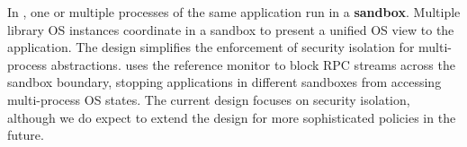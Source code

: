 In \graphene{},
one or multiple processes of the same application run in a {\bf sandbox}.
Multiple library OS instances coordinate
in a sandbox
to present a unified OS view
to the application.
The design simplifies the enforcement of security isolation for multi-process abstractions.
\graphene{}
uses the reference monitor to block RPC streams across the sandbox boundary,
stopping applications in different sandboxes from accessing multi-process OS states.
The current design focuses on security isolation, although we do expect to extend the design for more sophisticated policies
in the future.

